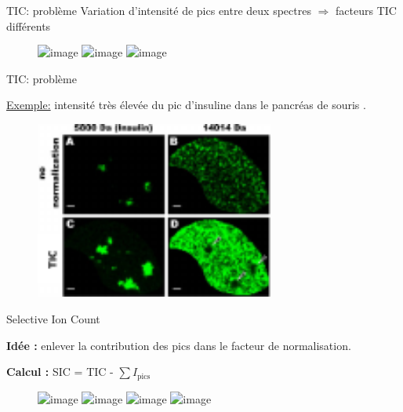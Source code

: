 \documentclass[10pt]{beamer}
\begin{document}
\begin{frame}{TIC: problème}
  Variation d'intensité de pics entre deux spectres $\Rightarrow$ facteurs TIC différents
  
  \begin{figure}[ht]
    \centering
    \includegraphics<1>[width=0.7\textwidth]{fig/normalization1}%
    \includegraphics<2>[width=0.7\textwidth]{fig/normalization2}%
    \includegraphics<3>[width=0.7\textwidth]{fig/normalization3}%
  \end{figure}

\end{frame}

\begin{frame}{TIC: problème}

  \underline{Exemple:} intensité très élevée du pic d'insuline dans le pancréas de souris \cite{Deininger_2011}.

  \begin{figure}[ht]
    \centering
    \includegraphics[width=0.7\textwidth]{fig/normalization_defect}
    \caption{}
    \label{fig:normalization_defect}
  \end{figure}

\end{frame}


\begin{frame}{Selective Ion Count}

  \textbf{Idée :} enlever la contribution des pics dans le facteur de normalisation.

  \textbf{Calcul :} SIC = TIC - $\sum I_{\text{pics}}$

  \vspace{0.4cm}

  \begin{figure}[ht]
    \centering
    \includegraphics<1>[width=0.7\textwidth]{fig/normalization2}%
    \includegraphics<2>[width=0.7\textwidth]{fig/normalization_sic1}%
    \includegraphics<3>[width=0.7\textwidth]{fig/normalization_sic2}%
    \includegraphics<4>[width=0.7\textwidth]{fig/normalization_sic3}%
    \caption{}
    \label{fig:normalization_sic1}
  \end{figure}


\end{frame}
\end{document}
